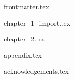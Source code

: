 \documentclass[11pt,twoside]{book}
\newcommand{\tclear}{\clearpage{\pagestyle{empty}\cleardoublepage}}
\begin{document}
\pagestyle{fancy}

\frontmatter

{frontmatter.tex}

\tableofcontents

\tclear

\mainmatter

{chapter_1_import.tex}
\tclear

{chapter_2.tex}
\tclear


\appendix

{appendix.tex}
\tclear


\backmatter




{acknowledgements.tex}
\tclear
\end{document}
